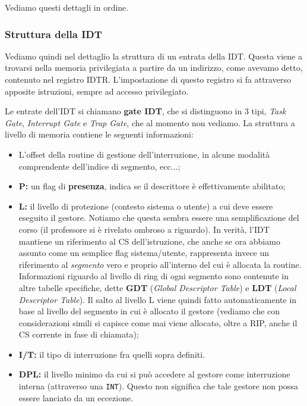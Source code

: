 \documentclass[a4paper,11pt]{article}
\begin{document}
Vediamo questi dettagli in ordine.

\subsubsection{Struttura della IDT}
Vediamo quindi nel dettaglio la struttura di un entrata della IDT.
Questa viene a trovarsi nella memoria privilegiata a partire da un indirizzo, come avevamo detto, contenuto nel registro IDTR.
L'impostazione di questo registro si fa attraverso apposite istruzioni, sempre ad accesso privilegiato.

Le entrate dell'IDT si chiamano \textbf{gate IDT}, che si distinguono in 3 tipi, \textit{Task Gate}, \textit{Interrupt Gate} e \textit{Trap Gate}, che al momento non vediamo.
La struttura a livello di memoria contiene le seguenti informazioni:
\begin{itemize}
	\item L'offset della routine di gestione dell'interruzione, in alcune modalità comprendente dell'indice di segmento, ecc...;
	\item \textbf{P:} un flag di \textbf{presenza}, indica se il descrittore è effettivamente abilitato;
	\item \textbf{L:} il livello di protezione (contesto sistema o utente) a cui deve essere eseguito il gestore. Notiamo che questa sembra essere una semplificazione del corso (il professore si è rivelato ombroso a riguardo). In verità, l'IDT mantiene un riferimento al CS dell'istruzione, che anche se ora abbiamo assunto come un semplice flag sistema/utente, rappresenta invece un riferimento al \textit{segmento} vero e proprio all'interno del cui è allocata la routine. Informazioni riguardo al livello di ring di ogni segmento sono contenute in altre tabelle specifiche, dette \textbf{GDT} (\textit{Global Descriptor Table}) e \textbf{LDT} (\textit{Local Descriptor Table}). Il salto al livello L viene quindi fatto automaticamente in base al livello del segmento in cui è allocato il gestore (vediamo che con considerazioni simili si capisce come mai viene allocato, oltre a RIP, anche il CS corrente in fase di chiamata);
	\item \textbf{I/T:} il tipo di interruzione fra quelli sopra definiti.
	\item \textbf{DPL:} il livello minimo da cui si può accedere al gestore come interruzione interna (attraverso una \lstinline|INT|).
		Questo non significa che tale gestore non possa essere lanciato da un eccezione. 
\end{itemize}		
\end{document}
